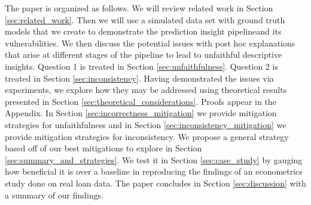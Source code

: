 \documentclass[mnsc,blindrev]{informs3}
\def\pipeline{prediction insight pipeline}
\begin{document}
    The paper is organized as follows. We will review related work in Section \ref{sec:related_work}. Then we will use a simulated data set with ground truth models that we create to demonstrate the \pipeline and its vulnerabilities. We then discuss the potential issues with post hoc explanations that arise at different stages of the pipeline to lead to unfaithful descriptive insights. Question 1 is treated in Section \ref{sec:unfaithfulness}. Question 2 is treated in Section \ref{sec:inconsistency}. Having demonstrated the issues via experiments, we explore how they may be addressed using theoretical results presented in Section \ref{sec:theoretical_considerations}. Proofs appear in the Appendix. In Section \ref{sec:incorrectness_mitigation} we provide mitigation strategies for unfaithfulness and in Section \ref{sec:inconsistency_mitigation} we provide mitigation strategies for inconsistency. We propose a general strategy based off of our best mitigations to explore in Section \ref{sec:summary_and_strategies}. We test it in Section \ref{sec:case_study} by gauging how beneficial it is over a baseline in reproducing the findings of an econometrics study done on real loan data. The paper concludes in Section \ref{sec:discussion} with a summary of our findings.
    
\end{document}

